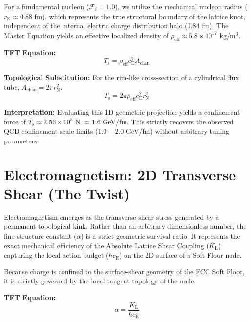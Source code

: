 For a fundamental nucleon ($\mathcal{F}_i = 1.0$), we utilize the mechanical nucleon radius ($r_{\mathrm{N}} \approx 0.88$ fm), which represents the true structural boundary of the lattice knot, independent of the internal electric charge distribution halo ($0.84$ fm). The Master Equation yields an effective localized density of $\rho_{\mathrm{eff}} \approx 5.8 \times 10^{17}$ kg/m$^3$.

\vspace{0.5em}
\noindent\textbf{TFT Equation:}
\begin{equation}
    T_{\mathrm{s}} = \rho_{\mathrm{eff}} c_{\mathrm{E}}^2 A_{\mathrm{chan}}
\end{equation}

\vspace{0.5em}
\noindent\textbf{Topological Substitution:} For the rim-like cross-section of a cylindrical flux tube, $A_{\mathrm{chan}} = 2\pi r_{\mathrm{N}}^2$.
\begin{equation}
    T_{\mathrm{s}} = 2\pi \rho_{\mathrm{eff}} c_{\mathrm{E}}^2 r_{\mathrm{N}}^2
\end{equation}

\vspace{0.5em}
\noindent\textbf{Interpretation:} Evaluating this 1D geometric projection yields a confinement force of $T_{\mathrm{s}} \approx 2.56 \times 10^5$ N $\approx 1.6$ GeV/fm. This strictly recovers the observed QCD confinement scale limits ($1.0 - 2.0$ GeV/fm) without arbitrary tuning parameters.

\section{Electromagnetism: 2D Transverse Shear (The Twist)}
Electromagnetism emerges as the transverse shear stress generated by a permanent topological kink. Rather than an arbitrary dimensionless number, the fine-structure constant ($\alpha$) is a strict geometric survival ratio. It represents the exact mechanical efficiency of the Absolute Lattice Shear Coupling ($K_{\mathrm{L}}$) capturing the local action budget ($\hbar c_{\mathrm{E}}$) on the 2D surface of a Soft Floor node.

Because charge is confined to the surface-shear geometry of the FCC Soft Floor, it is strictly governed by the local tangent topology of the node.

\vspace{0.5em}
\noindent\textbf{TFT Equation:}
\begin{equation}
    \alpha = \frac{K_{\mathrm{L}}}{\hbar c_{\mathrm{E}}}
\end{equation}

